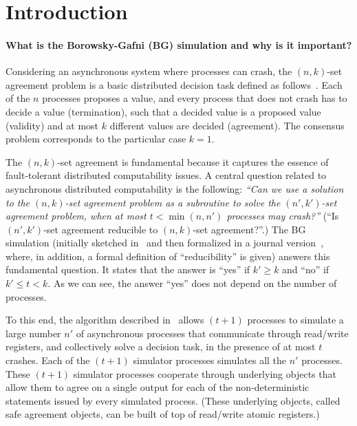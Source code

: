 \documentclass[11pt,letterpaper]{article}
\begin{document}
\section{Introduction}
\paragraph{What is the Borowsky-Gafni (BG) simulation and why is it important?}
Considering an asynchronous system where processes can crash, the $(n,k)$-set
agreement problem is a basic distributed decision task defined as
follows~\cite{C93}.
Each of  the $n$ processes  proposes a value,  and every process  that does
not crash has  to decide a value (termination), such  that a decided value
is a proposed value (validity) and at most $k$ different values are decided
(agreement). The consensus problem corresponds to the particular case $k=1$.

The $(n,k)$-set agreement is fundamental because it captures the essence 
of fault-tolerant distributed computability issues. 
A central  question related to asynchronous distributed computability is
the following: 
{\sl ``Can we use a  solution to the $(n,k)$-set
agreement problem as a subroutine to solve the  $(n',k')$-set
agreement problem, when at most $t<\min(n,n')$ processes may crash?''}
(``Is $(n',k')$-set agreement  reducible to $(n,k)$-set agreement?''.)
The BG simulation (initially sketched in~\cite{BG93}
and then formalized  in a journal version~\cite{BGLR01},
 where, in addition, a formal definition of ``reducibility'' is given) 
answers this  fundamental question.
It states that the answer is ``yes'' if $k' \geq k$ and  ``no'' if
$k' \leq t <k$. As we can see, the answer ``yes'' does not depend on
the number of processes.


To this end, the algorithm described in~\cite{BGLR01} allows $(t+1)$
processes  to simulate a large number $n'$ of asynchronous processes that
communicate through  read/write registers, and collectively solve a decision
task, in the presence of at most $t$ crashes.
Each of the  $(t+1)$ simulator processes simulates all the $n'$ processes.
These $(t+1)$ simulator processes cooperate through underlying objects
that allow them to agree on a single output for each  of the non-deterministic
statements  issued by every simulated process. (These underlying objects,
called safe agreement objects, can be built of top of read/write atomic
registers.)
\end{document}
